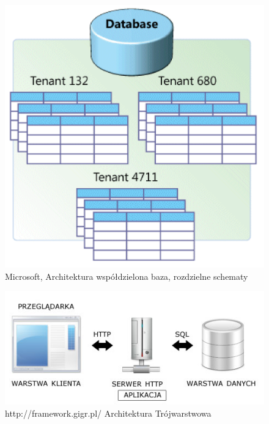 \documentclass[a4paper, 10pt, twoside, openright]{report}
\begin{document}
\begin{large}
\begin{figure}[H]           %
    \centering
    \includegraphics[width=12cm]{figures/multitenant_4.png}
    \caption{Microsoft, Architektura współdzielona baza, rozdzielne schematy}
    \label{fig:multitenant}
\end{figure}

\begin{figure}[H]           %
    \centering
    \includegraphics[width=12cm]{figures/framwork-gigr-pl_architektura_www.jpg}
    \caption{http://framework.gigr.pl/ Architektura Trójwarstwowa}
    \label{fig:architeturatrojwarstwowa}
\end{figure}



\end{large}
\end{document}
